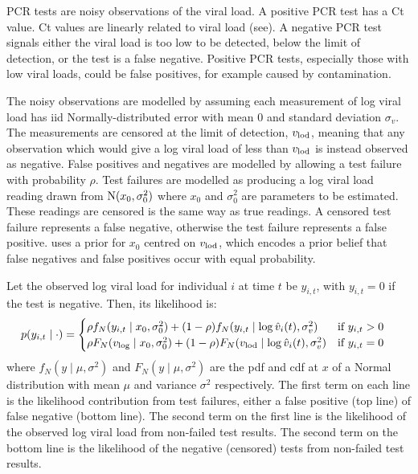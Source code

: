 \documentclass[thesis.tex]{subfiles}
\begin{document}
PCR tests are noisy observations of the viral load.
A positive PCR test has a Ct value.
Ct values are linearly related to viral load (see).
A negative PCR test signals either the viral load is too low to be detected, \ie below the limit of detection, or the test is a false negative.
Positive PCR tests, especially those with low viral loads, could be false positives, for example caused by contamination.

The noisy observations are modelled by assuming each measurement of log viral load has iid Normally-distributed error with mean 0 and standard deviation $\sigma_v$.
The measurements are censored at the limit of detection, $v_\text{lod}$, meaning that any observation which would give a log viral load of less than $v_\text{lod}$ is instead observed as negative.
False positives and negatives are modelled by allowing a test failure with probability $\rho$.
Test failures are modelled as producing a log viral load reading drawn from $\operatorname{N}(x_0, \sigma_0^2)$ where $x_0$ and $\sigma_0^2$ are parameters to be estimated.
These readings are censored is the same way as true readings.
A censored test failure represents a false negative, otherwise the test failure represents a false positive.
\textcite{hakkiOnset} uses a prior for $x_0$ centred on $v_\text{lod}$, which encodes a prior belief that false negatives and false positives occur with equal probability.

Let the observed log viral load for individual $i$ at time $t$ be $y_{i,t}$, with $y_{i,t}=0$ if the test is negative.
Then, its likelihood is:
\begin{align}
p(y_{i,t} \mid \cdot) &= \begin{cases}
    \rho f_N(y_{i,t} \mid x_0, \sigma_0^2) + (1 - \rho) f_N(y_{i,t} \mid \log \hat{v}_i(t), \sigma_v^2) & \text{if $y_{i,t} > 0$}\\
    \rho F_N(v_\text{log} \mid x_0, \sigma_0^2) + (1 - \rho) F_N(v_\text{lod} \mid \log \hat{v}_i(t), \sigma_v^2) & \text{if $y_{i,t} = 0$} \label{ATACCC:eq:hakki-likelihood}
\end{cases}
\end{align}
where $f_N(y \mid \mu, \sigma^2)$ and $F_N(y \mid \mu, \sigma^2)$ are the pdf and cdf at $x$ of a Normal distribution with mean $\mu$ and variance $\sigma^2$ respectively.
The first term on each line is the likelihood contribution from test failures, either a false positive (top line) of false negative (bottom line).
The second term on the first line is the likelihood of the observed log viral load from non-failed test results.
The second term on the bottom line is the likelihood of the negative (censored) tests from non-failed test results.
\end{document}
